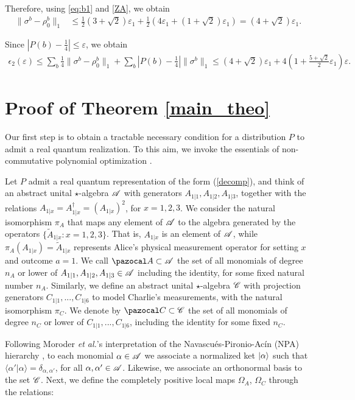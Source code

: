 \documentclass[onecolumn,prx,amsmath,amssymb,12pt]{revtex4-2}
\def\braket#1#2{\langle#1|#2\rangle}
\def\A{{\pazocal A}}
\def\C{{\pazocal C}}
\def\norm#1{\| #1 \| }
\def\abs#1{|#1|}
\begin{document}
\begin{appendix}
\noindent Therefore, using \eqref{eq:b1} and \eqref{ZA}, we obtain
\begin{align*}
\norm{\sigma^{b}-\rho_0^{b}}_1 &\leq 
 \frac{1}{2}(3+\sqrt{2})\varepsilon_1+\frac{1}{2}(4\varepsilon_1 + (1+\sqrt{2})\varepsilon_1) = (4+\sqrt{2})\varepsilon_1 .
\end{align*}

\noindent Since $\abs{P(b)-\frac{1}{4}} \leq \varepsilon$, we obtain 
\begin{align}
\epsilon_2(\varepsilon) \leq \sum_b \frac{1}{4} \norm{\sigma^b-\rho_0^b}_1 + \sum_b \abs{P(b)-\frac{1}{4}} \norm{ \sigma^b }_1\leq (4+\sqrt{2})\varepsilon_1 + 4 \left( 1 + \frac{5+\sqrt{2}}{2}\varepsilon_1\right) \varepsilon.
\end{align}

\section{Proof of Theorem \ref{main_theo}}
\label{numerics}

 
Our first step is to obtain a tractable necessary condition for a distribution $P$ to admit a real quantum realization. To this aim, we invoke the essentials of non-commutative polynomial optimization \cite{NOP}.

Let $P$ admit a real quantum representation of the form (\ref{decomp}), and think of an abstract unital $\star$-algebra ${\cal A}$ with generators $A_{1|1},A_{1|2},A_{1|3}$, together with the relations $A_{1|x}=A_{1|x}^\dagger=(A_{1|x})^2$, for $x=1,2,3$. We consider the natural isomorphism $\pi_A$ that maps any element of ${\cal A}$ to the algebra generated by the operators $\{\tilde{A}_{1|x}:x=1,2,3\}$. That is, $A_{1|x}$ is an element of ${\cal A}$, while $\pi_A(A_{1|x})=\tilde{A}_{1|x}$ represents Alice's physical measurement operator for setting $x$ and outcome $a=1$. We call $\A\subset {\cal A}$ the set of all monomials of degree $n_A$ or lower of $A_{1|1},A_{1|2},A_{1|3}\in {\cal A}$ including the identity, for some fixed natural number $n_A$. Similarly, we define an abstract unital $\star$-algebra ${\cal C}$ with projection generators $C_{1|1},...,C_{1|6}$ to model Charlie's measurements, with the natural isomorphism $\pi_C$. We denote by $\C\subset{\cal C}$ the set of all monomials of degree $n_C$ or lower of $C_{1|1},...,C_{1|6}$, including the identity for some fixed $n_C$.


Following Moroder \emph{et al.}'s interpretation \cite{moroder} of the Navascu\'es-Pironio-Ac\'in (NPA) hierarchy \cite{npa, npa2}, to each monomial $\alpha\in {\cal A}$ we associate a normalized ket $|\alpha\rangle$ such that $\braket{\alpha'}{\alpha}=\delta_{\alpha,\alpha'}$, for all $\alpha,\alpha'\in{\cal A}$. Likewise, we associate an orthonormal basis to the set ${\cal C}$. Next, we define the completely positive local maps $\Omega_A$, $\Omega_C$ through the relations:


\end{appendix}
\end{document}
